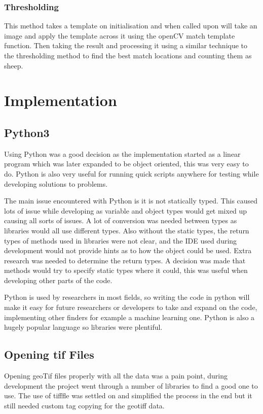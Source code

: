 \subsubsection{Thresholding}

This method takes a template on initialisation and when called upon will take an image and apply the template across it using the openCV match template function\cite{opencv-python}. Then taking the result and processing it using a similar technique to the thresholding method to find the best match locations and counting them as sheep.

\section{Implementation}

\subsection{Python3}

Using Python was a good decision as the implementation started as a linear program which was later expanded to be object oriented, this was very easy to do. Python is also very useful for running quick scripts anywhere for testing while developing solutions to problems.

The main issue encountered with Python is it is not statically typed. This caused lots of issue while developing as variable and object types would get mixed up causing all sorts of issues. A lot of conversion was needed between types as libraries would all use different types. Also without the static types, the return types of methods used in libraries were not clear, and the IDE used during development would not provide hints as to how the object could be used. Extra research was needed to determine the return types. A decision was made that methods would try to specify static types where it could, this was useful when developing other parts of the code.

Python is used by researchers in most fields, so writing the code in python will make it easy for future researchers or developers to take and expand on the code, implementing other finders for example a machine learning one. Python is also a hugely popular language so libraries were plentiful.

\subsection{Opening tif Files}
Opening geoTif files properly with all the data was a pain point, during development the project went through a number of libraries to find a good one to use. The use of tifffle was settled on and simplified the process in the end but it still needed custom tag copying for the geotiff data.

